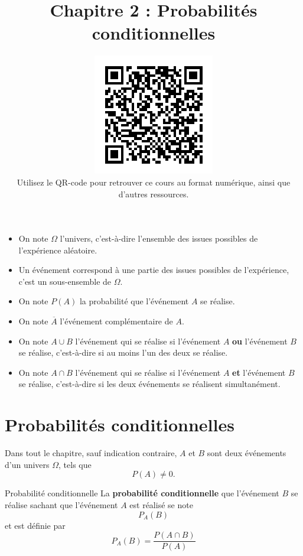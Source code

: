 \documentclass[11pt]{article}
\title{\vspace{-15mm}Chapitre 2 : Probabilités conditionnelles}
\date{\vspace{-12mm}\href{https://erou.forge.aeif.fr/spe-1e/probas-cond.html}
{\includegraphics{qr-probas-cond.png}}\\Utilisez le QR-code
pour retrouver ce cours au format numérique, ainsi que d'autres
ressources.\vspace{-5mm}}
\author{}
\begin{document}
\maketitle\thispagestyle{fancy}

\begin{notation}
  \begin{itemize}
    \item On note $\Omega$ l'univers, c'est-à-dire l'ensemble des issues
      possibles de l'expérience aléatoire.
    \item Un événement correspond à une partie des issues possibles de
      l'expérience, c'est un sous-ensemble de $\Omega$.
    \item On note $P(A)$ la probabilité que l'événement $A$ se réalise.
    \item On note $\overline A$ l'événement complémentaire de $A$.
    \item On note $A\cup B$ l'événement qui se réalise si l'événement $A$
      \textbf{ou} l'événement $B$ se réalise, c'est-à-dire si au moins l'un des
      deux se réalise.
    \item On note $A\cap B$ l'événement qui se réalise si l'événement $A$
      \textbf{et} l'événement $B$ se réalise, c'est-à-dire si les deux
      événements se réalisent simultanément.
  \end{itemize}
\end{notation}

\section{Probabilités conditionnelles}

\noindent Dans tout le chapitre, sauf indication contraire, $A$ et $B$ sont
deux événements d'un univers $\Omega$, tels que
\[
  P(A)\neq0.
\]

\begin{defi}{Probabilité conditionnelle}
  La \textbf{probabilité conditionnelle} que l'événement $B$ se réalise sachant
  que l'événement $A$ est réalisé se note
  \[
    P_A(B)
  \]
  et est définie par
  \[
    P_A(B) = \frac{P(A\cap B)}{P(A)}
  \]
\end{defi}
\end{document}
